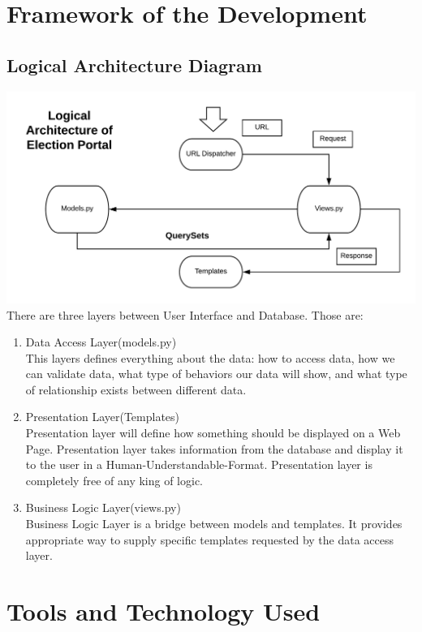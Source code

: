 \documentclass[12pt, a4paper, titlepage]{article}
\begin{document}
\newpage

\section{Framework of the Development}
\subsection{Logical Architecture Diagram}
\includegraphics[scale=0.8]{Logical_Architecture.png}\\
There are three layers between User Interface and Database. Those are:
\begin{enumerate}
\item Data Access Layer(models.py)\\
This layers defines everything about the data: how to access data, how we can validate data, what type of behaviors our data will show, and what type of relationship exists between different data.
\item Presentation Layer(Templates)\\
Presentation layer will define how something should be displayed on a Web Page. Presentation layer takes information from the database and display it to the user in a Human-Understandable-Format. Presentation layer is completely free of any king of logic.
\item Business Logic Layer(views.py)\\
Business Logic Layer is a bridge between models and templates. It provides appropriate way to supply specific templates requested by the data access layer.
\end{enumerate}
\newpage

\section{Tools and Technology Used}
\end{document}
